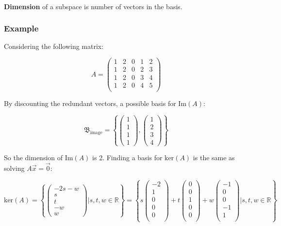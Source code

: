 \textbf{Dimension} of a subspace is number of vectors in the basis.

\subsubsection{Example}

Considering the following matrix:

\[A=\begin{pmatrix}
    1&2&0&1&2\\
    1&2&0&2&3\\
    1&2&0&3&4\\
    1&2&0&4&5\\
    \end{pmatrix}\]

By discounting the redundant vectors, a possible basis for $\mathrm{Im}(A)$:

\[\mathfrak{B}_\mathrm{image}=\left \{\begin{pmatrix} 1\\1\\1\\1 \end{pmatrix},\begin{pmatrix}1\\2\\3\\4 \end{pmatrix} \right\}\]

So the dimension of $\mathrm{Im}(A)$ is 2.
Finding a basis for $\mathrm{ker}(A)$ is the same as solving $A\vec{x}=\vec{0}$:

\[\mbox{ker}(A)=\left\{\begin{pmatrix}-2s-w\\ s\\t\\-w\\w \end{pmatrix} \Bigg| s,t,w\in\mathbb{R} \right\}=
\left\{s\begin{pmatrix}-2\\1\\0\\0\\0\\\end{pmatrix}+t\begin{pmatrix}0\\0\\1\\0\\0\\\end{pmatrix}+w\begin{pmatrix}-1\\0\\0\\-1\\1\\\end{pmatrix}\Bigg|s,t,w\in\mathbb{R}\right\}\]

